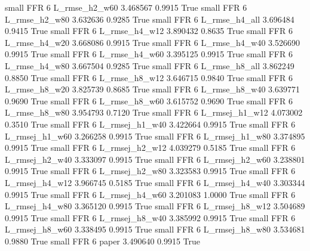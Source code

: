      small      FFR                 6  L_rmse_h2_w60   3.468567      0.9915    True
     small      FFR                 6  L_rmse_h2_w80   3.632636      0.9285    True
     small      FFR                 6  L_rmse_h4_all   3.696484      0.9415    True
     small      FFR                 6  L_rmse_h4_w12   3.890432      0.8635    True
     small      FFR                 6  L_rmse_h4_w20   3.668086      0.9915    True
     small      FFR                 6  L_rmse_h4_w40   3.526690      0.9915    True
     small      FFR                 6  L_rmse_h4_w60   3.395125      0.9915    True
     small      FFR                 6  L_rmse_h4_w80   3.667504      0.9285    True
     small      FFR                 6  L_rmse_h8_all   3.862249      0.8850    True
     small      FFR                 6  L_rmse_h8_w12   3.646715      0.9840    True
     small      FFR                 6  L_rmse_h8_w20   3.825739      0.8685    True
     small      FFR                 6  L_rmse_h8_w40   3.639771      0.9690    True
     small      FFR                 6  L_rmse_h8_w60   3.615752      0.9690    True
     small      FFR                 6  L_rmse_h8_w80   3.954793      0.7120    True
     small      FFR                 6 L_rmsej_h1_w12   4.073002      0.3510    True
     small      FFR                 6 L_rmsej_h1_w40   3.422664      0.9915    True
     small      FFR                 6 L_rmsej_h1_w60   3.266258      0.9915    True
     small      FFR                 6 L_rmsej_h1_w80   3.374895      0.9915    True
     small      FFR                 6 L_rmsej_h2_w12   4.039279      0.5185    True
     small      FFR                 6 L_rmsej_h2_w40   3.333097      0.9915    True
     small      FFR                 6 L_rmsej_h2_w60   3.238801      0.9915    True
     small      FFR                 6 L_rmsej_h2_w80   3.323583      0.9915    True
     small      FFR                 6 L_rmsej_h4_w12   3.966745      0.5185    True
     small      FFR                 6 L_rmsej_h4_w40   3.303344      0.9915    True
     small      FFR                 6 L_rmsej_h4_w60   3.201083      1.0000    True
     small      FFR                 6 L_rmsej_h4_w80   3.365120      0.9915    True
     small      FFR                 6 L_rmsej_h8_w12   3.504689      0.9915    True
     small      FFR                 6 L_rmsej_h8_w40   3.385992      0.9915    True
     small      FFR                 6 L_rmsej_h8_w60   3.338495      0.9915    True
     small      FFR                 6 L_rmsej_h8_w80   3.534681      0.9880    True
     small      FFR                 6          paper   3.490640      0.9915    True
